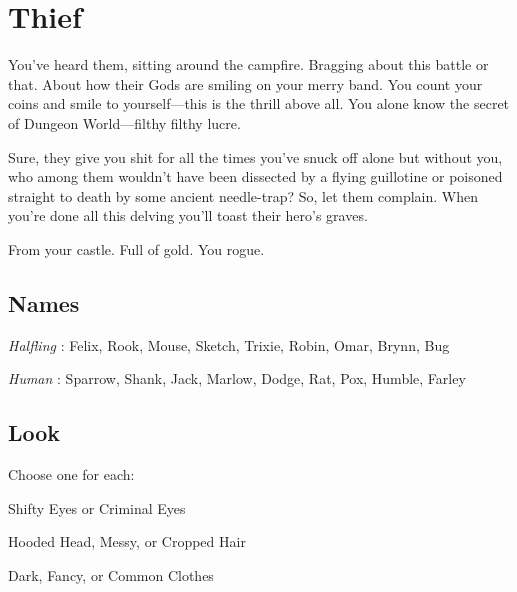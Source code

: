 \chapter{Thief}
  
            

         

You’ve heard them, sitting around the campfire. Bragging about this battle or that. About how their Gods are smiling on your merry band. You count your coins and smile to yourself—this is the thrill above all. You alone know the secret of Dungeon World—filthy filthy lucre.

         

Sure, they give you shit for all the times you’ve snuck off alone but without you, who among them wouldn’t have been dissected by a flying guillotine or poisoned straight to death by some ancient needle-trap? So, let them complain. When you’re done all this delving you’ll toast their hero’s graves.

         

From your castle. Full of gold. You rogue.

       

       
\section{Names}   
       

         

           {\em Halfling} : Felix, Rook, Mouse, Sketch, Trixie, Robin, Omar, Brynn, Bug

         

           {\em Human} : Sparrow, Shank, Jack, Marlow, Dodge, Rat, Pox, Humble, Farley

       

       
\section{Look}  
       

         

Choose one for each:

         

Shifty Eyes or Criminal Eyes

         

Hooded Head, Messy, or Cropped Hair

         

Dark, Fancy, or Common Clothes

